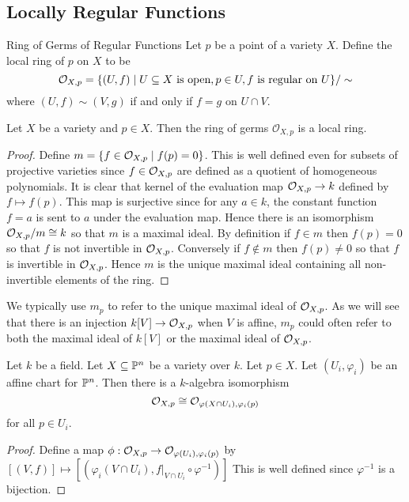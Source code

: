 \documentclass[a4paper]{article}
\begin{document}
\subsection{Locally Regular Functions}
\begin{defn}{Ring of Germs of Regular Functions}{} Let $p$ be a point of a variety $X$. Define the local ring of $p$ on $X$ to be $$\mathcal{O}_{X,p}=\{(U,f)\;|\;U\subseteq X\text{ is open}, p\in U, f\text{ is regular on }U\}/\sim$$ where $(U,f)\sim(V,g)$ if and only if $f=g$ on $U\cap V$. 
\end{defn}

\begin{prp}{}{} Let $X$ be a variety and $p\in X$. Then the ring of germs $\mathcal{O}_{X,p}$ is a local ring. \tcbline
\begin{proof}
Define $m=\{f\in\mathcal{O}_{X,p}\;|\;f(p)=0\}$. This is well defined even for subsets of projective varieties since $f\in\mathcal{O}_{X,p}$ are defined as a quotient of homogeneous polynomials. It is clear that kernel of the evaluation map $\mathcal{O}_{X,p}\to k$ defined by $f\mapsto f(p)$. This map is surjective since for any $a\in k$, the constant function $f=a$ is sent to $a$ under the evaluation map. Hence there is an isomorphism $\mathcal{O}_{X,p}/m\cong k$ so that $m$ is a maximal ideal. By definition if $f\in m$ then $f(p)=0$ so that $f$ is not invertible in $\mathcal{O}_{X,p}$. Conversely if $f\notin m$ then $f(p)\neq 0$ so that $f$ is invertible in $\mathcal{O}_{X,p}$. Hence $m$ is the unique maximal ideal containing all non-invertible elements of the ring. 
\end{proof}
\end{prp}

We typically use $m_p$ to refer to the unique maximal ideal of $\mathcal{O}_{X,p}$. As we will see that there is an injection $k[V]\to\mathcal{O}_{X,p}$ when $V$ is affine, $m_p$ could often refer to both the maximal ideal of $k[V]$ or the maximal ideal of $\mathcal{O}_{X,p}$. 

\begin{prp}{}{} Let $k$ be a field. Let $X\subseteq\mathbb{P}^n$ be a variety over $k$. Let $p\in X$. Let $(U_i,\varphi_i)$ be an affine chart for $\mathbb{P}^n$. Then there is a $k$-algebra isomorphism $$\mathcal{O}_{X,p}\cong\mathcal{O}_{\varphi(X\cap U_i),\varphi_i(p)}$$ for all $p\in U_i$. \tcbline
\begin{proof}
Define a map $\phi:\mathcal{O}_{X,p}\to\mathcal{O}_{\varphi(U_i),\varphi_i(p)}$ by $[(V,f)]\mapsto[(\varphi_i(V\cap U_i),f|_{V\cap U_i}\circ\varphi^{-1})]$ This is well defined since $\varphi^{-1}$ is a bijection. 
\end{proof}
\end{prp}
\end{document}
